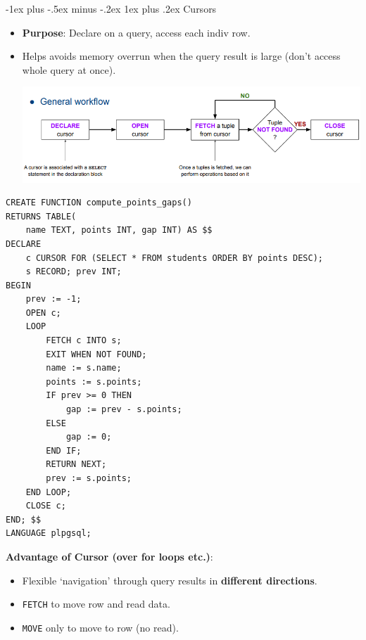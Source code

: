 \documentclass[12pt, landscape]{article}
\makeatletter
\newcommand{\code}[1]{\colorbox{gray!25!}{\lstinline|#1|}}
\renewcommand{\subsubsection}{\@startsection{subsubsection}{3}{0.1mm}%
                                {-1ex plus -.5ex minus -.2ex}%
                                {1ex plus .2ex}%
                                {\normalfont\small\bfseries}}
\makeatother
\begin{document}
\begin{multicols*}{3}
\subsubsection{Cursors}
\begin{itemize}
\item  \textbf{Purpose}: Declare on a query, access each indiv row. 
\item Helps avoids memory overrun when the query result is large (don't access whole query at once). \\
\centerline{\includegraphics[width=1 \linewidth]{cursorworkflow}}
\end{itemize}
\begin{lstlisting}
CREATE FUNCTION compute_points_gaps()
RETURNS TABLE(
    name TEXT, points INT, gap INT) AS $$
DECLARE
    c CURSOR FOR (SELECT * FROM students ORDER BY points DESC);
    s RECORD; prev INT;
BEGIN
    prev := -1;
    OPEN c;
    LOOP
        FETCH c INTO s;
        EXIT WHEN NOT FOUND;
        name := s.name;
        points := s.points;
        IF prev >= 0 THEN
            gap := prev - s.points;
        ELSE
            gap := 0;
        END IF;
        RETURN NEXT;
        prev := s.points;
    END LOOP;
    CLOSE c;
END; $$
LANGUAGE plpgsql;
\end{lstlisting}

\textbf{Advantage of Cursor (over for loops etc.)}:

\begin{itemize}
	\item Flexible `navigation' through query results in \textbf{different directions}.
	\item \code{FETCH} to move row and read data.
	\item \code{MOVE} only to move to row (no read).
\end{itemize}


\end{multicols*}
\end{document}
